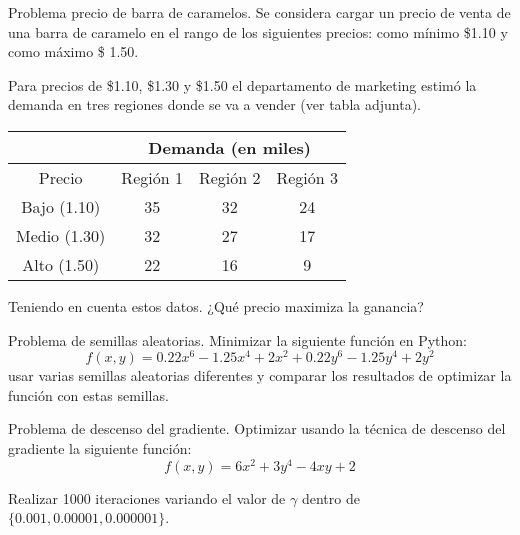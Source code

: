 \documentclass{beamer}
\begin{document}
\begin{frame}[fragile]{Problema precio de barra de caramelos.}
  Se considera cargar un precio de venta de una barra de caramelo en el rango de los siguientes precios: como mínimo \$1.10 y como máximo \$ 1.50.
  
  Para precios de \$1.10, \$1.30 y \$1.50 el departamento de marketing estimó la demanda en tres regiones donde se va a vender (ver tabla adjunta).

  \begin{center}
    \begin{adjustbox}{width = 0.9 \textwidth}
        \begin{tabular}{|c |c | c | c|}
          \hline
          & \multicolumn{3}{|c|}{Demanda (en miles)} \\ 
          \hline 
          Precio & Región 1 & Región 2 &  Región 3 \\ 
          \hline
          Bajo (1.10)  & 35 & 32 & 24 \\
          Medio (1.30) & 32 & 27 & 17 \\
          Alto (1.50)  & 22 & 16 & 9 \\
          \hline 
        \end{tabular}
    \end{adjustbox}
  \end{center}

  Teniendo en cuenta estos datos. 
  ¿Qué precio maximiza la ganancia?
\end{frame}

\begin{frame}[fragile]{Problema de semillas aleatorias.}
  Minimizar la siguiente función en Python: 
  \[
    f(x,y) = 
    0.22x^6 - 1.25x^4 + 2  x^2 + 0.22y^6 - 1.25y^4 + 2y^2
  \]
  usar varias semillas aleatorias diferentes y comparar los resultados de optimizar la función con estas semillas.
\end{frame}

\begin{frame}[fragile]{Problema de descenso del gradiente.}
  Optimizar usando la técnica de descenso del gradiente la siguiente función: 
  \[
    f(x,y) = 6x^{2} + 3y^{4} - 4xy + 2
  \]
  
  Realizar 1000 iteraciones variando el valor de $\gamma$ dentro de $\{0.001,0.00001,0.000001\}$.
\end{frame}
\end{document}
